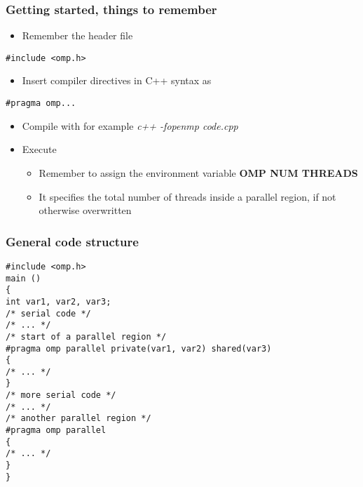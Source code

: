 \documentclass{beamer}
\begin{document}
\begin{frame}
\frametitle{Getting started, things to remember}

\begin{block}{}
\begin{itemize}
 \item Remember the header file 
\end{itemize}

\noindent
\begin{verbatim}
#include <omp.h>
\end{verbatim}
\begin{itemize}
 \item Insert compiler directives in C++ syntax as 
\end{itemize}

\noindent
\begin{verbatim}
#pragma omp...
\end{verbatim}
\begin{itemize}
\item Compile with for example \emph{c++ -fopenmp code.cpp}

\item Execute
\begin{itemize}

  \item Remember to assign the environment variable \textbf{OMP NUM THREADS}

  \item It specifies the total number of threads inside a parallel region, if not otherwise overwritten
\end{itemize}

\noindent
\end{itemize}

\noindent
\end{block}
\end{frame}

\begin{frame}
\frametitle{General code structure}

\begin{block}{}
\begin{verbatim}
#include <omp.h>
main ()
{
int var1, var2, var3;
/* serial code */
/* ... */
/* start of a parallel region */
#pragma omp parallel private(var1, var2) shared(var3)
{
/* ... */
}
/* more serial code */
/* ... */
/* another parallel region */
#pragma omp parallel
{
/* ... */
}
}
\end{verbatim}


\end{block}
\end{frame}
\end{document}
